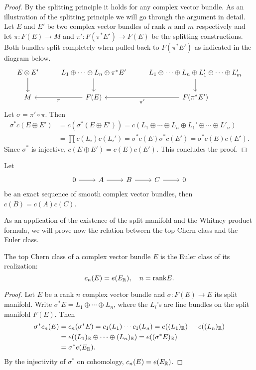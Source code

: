 \begin{proof}
By the splitting principle it holds for any complex vector bundle. As an illustration of the splitting principle we will go through the argument in detail. Let $E$ and 
$E'$ be two complex vector bundles of rank $n$ and $m$ respectively and let $\pi:F(E)\to M$ and $\pi':F(\pi^*E')\to F(E)$ be the splitting constructions.
Both bundles split completely when pulled back to $F(\pi^*E')$ as indicated in the diagram below.
\[\begin{tikzcd}
E\otimes E'\ar[d]&L_1\oplus\cdots\oplus L_n\oplus\pi^*E'\ar[d]&L_1\oplus\cdots\oplus L_n\oplus L_1'\oplus\cdots\oplus L_m'\ar[d]\\
M&F(E)\ar[l,"\pi"]&F(\pi^*E')\ar[l,"\pi'"]
\end{tikzcd}\]
Let $\sigma=\pi'\circ\pi$. Then
\begin{align*}
\sigma^*c(E\oplus E')&=c(\sigma^*(E\oplus E'))=c(L_1\oplus\cdots\oplus L_n\oplus L_1'\oplus\cdots\oplus L'_n)\\
&=\prod c(L_i)c(L_i')=\sigma^*c(E)\sigma^*c(E')=\sigma^*c(E)c(E').
\end{align*}
Since $\sigma^*$ is injective, $c(E\oplus E')=c(E)c(E')$. This concludes the proof.
\end{proof}
\begin{corollary}
Let
\[\begin{tikzcd}
0\ar[r]&A\ar[r]&B\ar[r]&C\ar[r]&0
\end{tikzcd}\]
be an exact sequence of smooth complex vector bundles, then $c(B)=c(A)c(C)$.
\end{corollary}
As an application of the existence of the split manifold and the Whitney product formula, we will prove now the relation between the top Chern class and the Euler class.
\begin{proposition}
The top Chern class of a complex vector bundle $E$ is the Euler class of its realization:
\[c_n(E)=e(E_{\mathbb{R}}),\quad n=\mathrm{rank} E.\]
\end{proposition}
\begin{proof}
Let $E$ be a rank $n$ complex vector bundle and $\sigma:F(E)\to E$ its split manifold. Write $\sigma^*E=L_1\oplus\cdots\oplus L_n$, where the $L_i$'s are line bundles 
on the split manifold $F(E)$. Then
\begin{align*}
\sigma^*c_n(E)&=c_n(\sigma^*E)=c_1(L_1)\cdots c_1(L_n)=e((L_1)_{\mathbb{R}})\cdots e((L_n)_{\mathbb{R}})\\
&=e((L_1)_{\mathbb{R}}\oplus\cdots\oplus(L_n)_{\mathbb{R}})=e((\sigma^*E)_{\mathbb{R}})\\
&=\sigma^*e(E_{\mathbb{R}}).
\end{align*}
By the injectivity of $\sigma^*$ on cohomology, $c_n(E)=e(E_{\mathbb{R}})$.
\end{proof}
